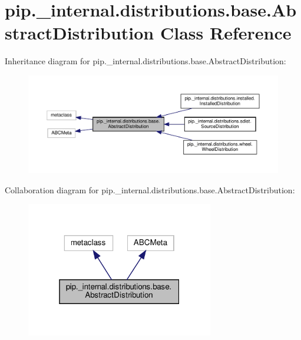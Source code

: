 \hypertarget{classpip_1_1__internal_1_1distributions_1_1base_1_1AbstractDistribution}{}\section{pip.\+\_\+internal.\+distributions.\+base.\+Abstract\+Distribution Class Reference}
\label{classpip_1_1__internal_1_1distributions_1_1base_1_1AbstractDistribution}


Inheritance diagram for pip.\+\_\+internal.\+distributions.\+base.\+Abstract\+Distribution\+:
\nopagebreak
\begin{figure}[H]
\begin{center}
\leavevmode
\includegraphics[width=350pt]{classpip_1_1__internal_1_1distributions_1_1base_1_1AbstractDistribution__inherit__graph}
\end{center}
\end{figure}


Collaboration diagram for pip.\+\_\+internal.\+distributions.\+base.\+Abstract\+Distribution\+:
\nopagebreak
\begin{figure}[H]
\begin{center}
\leavevmode
\includegraphics[width=232pt]{classpip_1_1__internal_1_1distributions_1_1base_1_1AbstractDistribution__coll__graph}
\end{center}
\end{figure}
